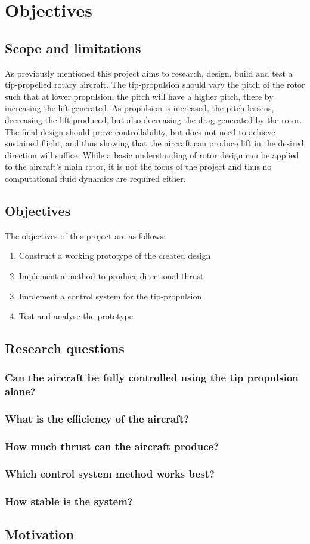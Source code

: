 \chapter{Objectives}

\section{Scope and limitations}
    As previously mentioned this project aims to research, design, build and test a tip-propelled rotary aircraft. The tip-propulsion should vary the pitch of the rotor such that at lower propulsion, the pitch will have a higher pitch, there by increasing the lift generated. As propulsion is increased, the pitch lessens, decreasing the lift produced, but also decreasing the drag generated by the rotor. The final design should prove controllability, but does not need to achieve sustained flight, and thus showing that the aircraft can produce lift in the desired direction will suffice. While a basic understanding of rotor design can be applied to the aircraft's main rotor, it is not the focus of the project and thus no computational fluid dynamics are required either.

\section{Objectives}
    The objectives of this project are as follows:
    \begin{enumerate}
        \item Construct a working prototype of the created design 
        \item Implement a method to produce directional thrust
        \item Implement a control system for the tip-propulsion
        \item Test and analyse the prototype
    \end{enumerate}
\section{Research questions}
    \subsection{Can the aircraft be fully controlled using the tip propulsion alone?}
    \subsection{What is the efficiency of the aircraft?}
    \subsection{How much thrust can the aircraft produce?}
    \subsection{Which control system method works best?}
    \subsection{How stable is the system?}
    
\section{Motivation}